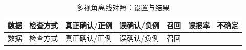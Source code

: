 \FloatBarrier\begingroup\small\setlength{\tabcolsep}{2.5pt}
\begin{longtable}[]{@{}
  >{\raggedright\arraybackslash}p{}
  >{\raggedright\arraybackslash}p{}
  >{\raggedleft\arraybackslash}p{}
  >{\raggedleft\arraybackslash}p{}
  >{\raggedleft\arraybackslash}p{}
  >{\raggedleft\arraybackslash}p{}
  >{\raggedleft\arraybackslash}p{}@{}}
\caption{多视角离线对照：设置与结果}\label{tab:s13-10}\tabularnewline
\toprule\noalign{}
\begin{minipage}[b]{\linewidth}\raggedright
数据
\end{minipage} & \begin{minipage}[b]{\linewidth}\raggedright
检查方式
\end{minipage} & \begin{minipage}[b]{\linewidth}\raggedleft
真正确认/正例
\end{minipage} & \begin{minipage}[b]{\linewidth}\raggedleft
误确认/负例
\end{minipage} & \begin{minipage}[b]{\linewidth}\raggedleft
召回
\end{minipage} & \begin{minipage}[b]{\linewidth}\raggedleft
误报率
\end{minipage} & \begin{minipage}[b]{\linewidth}\raggedleft
不确定
\end{minipage} \\
\midrule\noalign{}
\endfirsthead
\toprule\noalign{}
\begin{minipage}[b]{\linewidth}\raggedright
数据
\end{minipage} & \begin{minipage}[b]{\linewidth}\raggedright
检查方式
\end{minipage} & \begin{minipage}[b]{\linewidth}\raggedleft
真正确认/正例
\end{minipage} & \begin{minipage}[b]{\linewidth}\raggedleft
误确认/负例
\end{minipage} & \begin{minipage}[b]{\linewidth}\raggedleft
召回
\end{minipage} & \begin{minipage}[b]{\linewidth}\raggedleft

\end{minipage}
\end{longtable}
